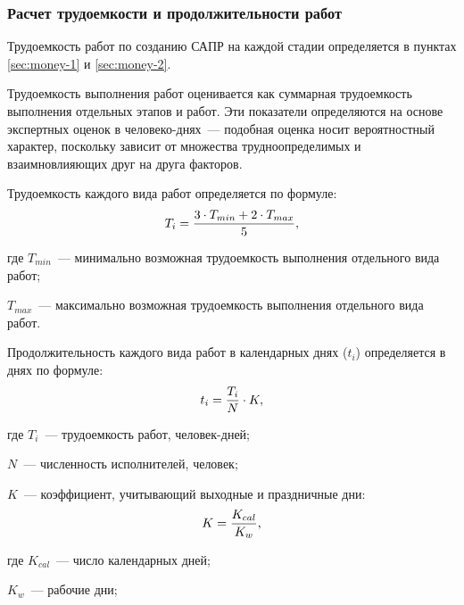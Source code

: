 \subsubsection{Расчет трудоемкости и продолжительности работ}
Трудоемкость работ по созданию САПР на каждой стадии определяется в пунктах \ref{sec:money-1} и \ref{sec:money-2}.

Трудоемкость выполнения работ оценивается как суммарная трудоемкость выполнения отдельных этапов и работ.
Эти показатели определяются на основе экспертных оценок в человеко-днях~--- подобная оценка носит вероятностный характер, поскольку зависит от множества трудноопределимых и взаимновлияющих друг на друга факторов.

Трудоемкость каждого вида работ определяется по формуле:
\begin{equation}\label{eq:ec-1}
  T_i = {{3 \cdot T_{min} + 2 \cdot T_{max}} \over {5}},
\end{equation}
\begin{ESKDexplanation}
  \item[где ] $T_{min}$~--- минимально возможная трудоемкость выполнения отдельного вида работ;
  \item $T_{max}$~--- максимально возможная трудоемкость выполнения отдельного вида работ.
\end{ESKDexplanation}

Продолжительность каждого вида работ в календарных днях ($t_i$) определяется в днях по формуле:
\begin{equation}\label{eq:ec-2}
  t_i = {{T_i} \over {N}} \cdot K,
\end{equation}
  \begin{ESKDexplanation}
    \item[где ] $T_i$~--- трудоемкость работ, человек-дней;
    \item $N$~--- численность исполнителей, человек;
    \item $K$~--- коэффициент, учитывающий выходные и праздничные дни:
    \begin{equation}
      K = {K_{cal} \over K_w},
    \end{equation}
    \begin{ESKDexplanation}
      \item[где ] $K_{cal}$~--- число календарных дней;
      \item $K_w$~--- рабочие дни;
    \end{ESKDexplanation}
  \end{ESKDexplanation}

